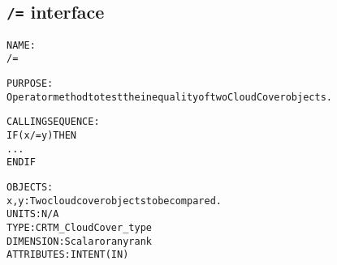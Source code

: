 \subsection{\texttt{/=} interface}
  \label{sec:/=_interface}
  \begin{alltt}
 
  NAME:
    /=
 
  PURPOSE:
    Operator method to test the inequality of two CloudCover objects.
 
  CALLING SEQUENCE:
    IF ( x /= y ) THEN
      ...
    END IF
 
  OBJECTS:
    x, y:  Two cloud cover objects to be compared.
           UNITS:      N/A
           TYPE:       CRTM_CloudCover_type
           DIMENSION:  Scalar or any rank
           ATTRIBUTES: INTENT(IN)
 
  \end{alltt}
